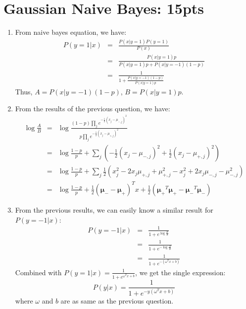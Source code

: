 \documentclass[12pt]{article}
\begin{document}
\section{Gaussian Naive Bayes: 15pts}
\begin{enumerate}
    \item From naive bayes equation, we have:
    \begin{eqnarray}
    P(y=1|x) &=& \frac{P(x|y=1)P(y=1)}{P(x)} \nonumber
        \\    &=& \frac{P(x|y=1)p}{P(x|y=1)p + P(x|y=-1)(1-p)} \nonumber
        \\    &=& \frac{1}{1 + \frac{P(x|y=-1)(1-p)}{P(x|y=1)p}} \nonumber
    \end{eqnarray}
    Thus, $A = P(x|y=-1)(1-p)$, $B = P(x|y=1)p$.
    \item From the results of the previous question, we have: \begin{eqnarray}
        \log \frac{A}{B} &=& \log \frac{(1-p)\prod_{j} e^{-\frac{1}{2}(x_{j}-\mu _{-,j})^{2}}}{p\prod_{j} e^{-\frac{1}{2}(x_{j}-\mu _{+,j})^{2}}} \nonumber
        \\ &=& \log \frac{1-p}{p} + \sum_{j} \left( -\frac{1}{2}(x_{j}-\mu _{-,j})^{2} + \frac{1}{2}(x_{j}-\mu _{+,j})^{2} \right) \nonumber
        \\ &=& \log \frac{1-p}{p} + \sum_{j} \frac{1}{2} \left(x_{j}^{2} - 2 x_{j}\mu _{+,j} + \mu _{+,j}^{2} - x_{j}^{2} +2 x_{j}\mu _{-,j} -\mu _{-,j}^{2} \right) \nonumber
        \\ &=& \log \frac{1-p}{p} + \frac{1}{2} (\mathbf{\mu_{-}} - \mathbf{\mu_{+}})^{T}x + \frac{1}{2}(\mathbf{\mu_{+}}^{T}\mathbf{\mu_{+}} - \mathbf{\mu_{-}}^{T}\mathbf{\mu _{-}}) \nonumber
    \end{eqnarray}
    \item From the previous results, we can easily know a similar result for $P(y=-1|x)$:
    \begin{eqnarray}
        P(y=-1|x) &=& \frac{1}{1 + e^{\log\frac{B}{A}}} \nonumber
        \\ &=& \frac{1}{1 + e^{-\log\frac{A}{B}}} \nonumber
        \\ &=& \frac{1}{1 + e^{-(\omega^{T}x+b)}} \nonumber
    \end{eqnarray}
    Combined with $P(y=1|x) = \frac{1}{1+e^{\omega^{T}x+b}}$, we get the single expression: \begin{equation}
        P(y|x) = \frac{1}{1+e^{-y(\omega^{T}x+b)}}
    \end{equation} where $\omega$ and $b$ are as same as the previous question.
\end{enumerate}
\end{document}
